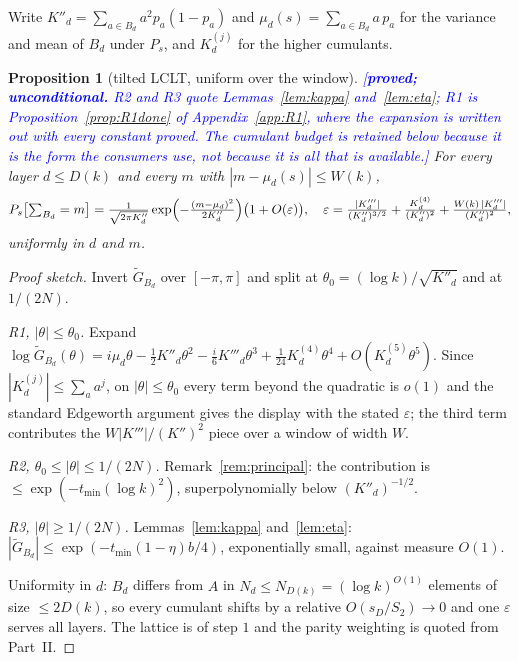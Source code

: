 \documentclass[11pt,a4paper]{article}
\theoremstyle{plain}
\newtheorem{proposition}[theorem]{Proposition}
\theoremstyle{definition}
\theoremstyle{remark}
\newcommand{\STATUS}[1]{\textcolor{blue}{\textsf{[#1]}}}
\begin{document}
Write $K''_d=\sum_{a\in B_d}a^{2}p_a(1-p_a)$ and $\mu_d(s)=\sum_{a\in B_d}a\,p_a$ for the
variance and mean of $B_d$ under $P_s$, and $K^{(j)}_d$ for the higher cumulants.

\begin{proposition}[tilted LCLT, uniform over the window]\label{prop:tiltlclt}
\STATUS{\textbf{proved; unconditional.} R2 and R3 quote Lemmas~\ref{lem:kappa}
and~\ref{lem:eta}; R1 is Proposition~\ref{prop:R1done} of Appendix~\ref{app:R1}, where the
expansion is written out with every constant proved. The cumulant budget is retained below
because it is the form the consumers use, not because it is all that is available.}
For every layer $d\le D(k)$ and every $m$ with $|m-\mu_d(s)|\le W(k)$,
\[
  P_s\bigl[\textstyle\sum_{B_d}=m\bigr]
  =\frac{1}{\sqrt{2\pi K''_d}}\exp\Bigl(-\frac{(m-\mu_d)^{2}}{2K''_d}\Bigr)\bigl(1+O(\varepsilon)\bigr),
  \quad
  \varepsilon=\frac{|K'''_d|}{(K''_d)^{3/2}}+\frac{K^{(4)}_d}{(K''_d)^{2}}
     +\frac{W(k)\,|K'''_d|}{(K''_d)^{2}},
\]
uniformly in $d$ and $m$.
\end{proposition}

\begin{proof}[Proof sketch]
Invert $\widetilde G_{B_d}$ over $[-\pi,\pi]$ and split at
$\theta_0=(\log k)/\sqrt{K''_d}$ and at $1/(2N)$.

\emph{R1, $|\theta|\le\theta_0$.} Expand
$\log\widetilde G_{B_d}(\theta)=i\mu_d\theta-\tfrac12K''_d\theta^{2}
-\tfrac{i}{6}K'''_d\theta^{3}+\tfrac1{24}K^{(4)}_d\theta^{4}+O(K^{(5)}_d\theta^{5})$.
Since $|K^{(j)}_d|\le\sum_{a}a^{j}$, on $|\theta|\le\theta_0$ every term beyond the quadratic
is $o(1)$ and the standard Edgeworth argument gives the display with the stated $\varepsilon$;
the third term contributes the $W|K'''|/(K'')^{2}$ piece over a window of width $W$.

\emph{R2, $\theta_0\le|\theta|\le1/(2N)$.} Remark~\ref{rem:principal}: the contribution is
$\le\exp(-t_{\min}(\log k)^{2})$, superpolynomially below $(K''_d)^{-1/2}$.

\emph{R3, $|\theta|\ge1/(2N)$.} Lemmas~\ref{lem:kappa} and~\ref{lem:eta}:
$|\widetilde G_{B_d}|\le\exp(-t_{\min}(1-\eta)b/4)$, exponentially small, against measure
$O(1)$.

Uniformity in $d$: $B_d$ differs from $A$ in $N_d\le N_{D(k)}=(\log k)^{O(1)}$ elements of size
$\le2D(k)$, so every cumulant shifts by a relative $O(s_{D}/S_2)\to0$ and one $\varepsilon$
serves all layers. The lattice is of step $1$ and the parity weighting is quoted from Part~II.
\end{proof}
\end{document}
